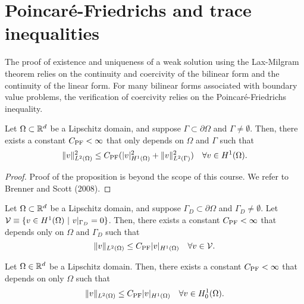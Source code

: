 \section{Poincar\'e-Friedrichs and trace inequalities}
The proof of existence and uniqueness of a weak solution using the Lax-Milgram theorem relies on the continuity and coercivity of the bilinear form and the continuity of the linear form.  For many bilinear forms associated with boundary value problems, the verification of coercivity relies on the Poincar\'e-Friedrichs inequality.
\begin{proposition}
  \label{prop:posnd_friedrichs}
  Let $\Omega \subset \mathbb{R}^d$ be a Lipschitz domain, and suppose $\Gamma \subset \partial \Omega$ and $\Gamma \neq \emptyset$. Then, there exists a constant $C_{\rm PF} < \infty$ that only depends on $\Omega$ and $\Gamma$ such that
  \begin{equation*}
    \| v \|_{L^2(\Omega)}^2 \leq C_{\rm PF} ( | v |^2_{H^1(\Omega)} + \| v \|^2_{L^2(\Gamma)} )  \quad \forall v \in H^1(\Omega).
  \end{equation*}
  \begin{proof}
    Proof of the proposition is beyond the scope of this course.  We refer to Brenner and Scott (2008).
  \end{proof}
\end{proposition}
\begin{corollary}
  \label{cor:posnd_friedrichs_1}
  Let $\Omega \subset \mathbb{R}^d$ be a Lipschitz domain, and suppose $\Gamma_D \subset \partial \Omega$ and $\Gamma_D \neq \emptyset$.   Let $\mathcal{V} \equiv \{ v \in H^1(\Omega) \ | \ v|_{\Gamma_D} = 0 \}$.  Then, there exists a constant $C_{\rm PF} < \infty$ that depends only on $\Omega$ and $\Gamma_D$ such that
  \begin{equation*}
    \| v \|_{L^2(\Omega)} \leq C_{\rm PF} | v |_{H^1(\Omega)} \quad \forall v \in \mathcal{V}.
  \end{equation*}
\end{corollary}
\begin{corollary}
  \label{cor:posnd_friedrichs_2}
  Let $\Omega \in \mathbb{R}^d$ be a Lipschitz domain. Then, there exists a constant $C_{\rm PF} < \infty$ that depends on only $\Omega$ such that
  \begin{equation*}
    \| v \|_{L^2(\Omega)} \leq C_{\rm PF} | v |_{H^1(\Omega)} \quad \forall v \in H^1_0(\Omega).
  \end{equation*}
\end{corollary}
